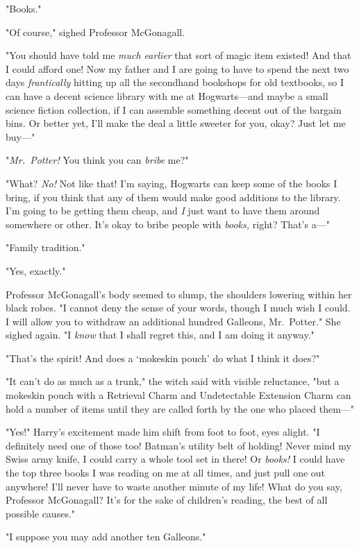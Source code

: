 "Books."

"Of course," sighed Professor McGonagall.

"You should have told me \emph{much earlier} that sort of magic item existed!
And that I could afford one! Now my father and I are going to have to spend the
next two days \emph{frantically} hitting up all the secondhand bookshops for
old textbooks, so I can have a decent science library with me at Hogwarts—and
maybe a small science fiction collection, if I can assemble something decent
out of the bargain bins. Or better yet, I'll make the deal a little sweeter for
you, okay? Just let me buy—"

"\emph{Mr.~Potter!} You think you can \emph{bribe} me?"

"What? \emph{No!} Not like that! I'm saying, Hogwarts can keep some of the
books I bring, if you think that any of them would make good additions to the
library. I'm going to be getting them cheap, and \emph{I} just want to have
them around somewhere or other. It's okay to bribe people with \emph{books,}
right? That's a—"

"Family tradition."

"Yes, exactly."

Professor McGonagall's body seemed to slump, the shoulders lowering within her
black robes. "I cannot deny the sense of your words, though I much wish I
could. I will allow you to withdraw an additional hundred Galleons,
Mr.~Potter." She sighed again. "I \emph{know} that I shall regret this, and I
am doing it anyway."

"That's the spirit! And does a `mokeskin pouch' do what I think it does?"

"It can't do as much as a trunk," the witch said with visible reluctance,
"but{\el} a mokeskin pouch with a Retrieval Charm and Undetectable Extension
Charm can hold a number of items until they are called forth by the one who
placed them—"

"Yes!" Harry's excitement made him shift from foot to foot,
eyes alight. "I definitely need one of those too! 
Batman's utility belt of holding! Never mind my Swiss
army knife, I could carry a whole tool set in there! Or \emph{books!} I could
have the top three books I was reading on me at all times, and just pull one
out anywhere! I'll never have to waste another minute of my life! What do you
say, Professor McGonagall? It's for the sake of children's reading, the best of
all possible causes."

"{\el}I suppose you may add another ten Galleons."

